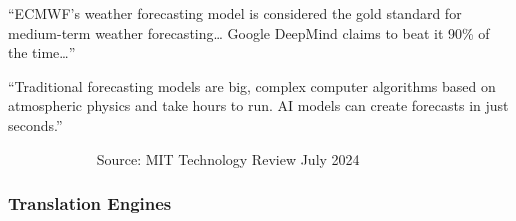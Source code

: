 \begin{frame}

    
    ``ECMWF's weather forecasting model is considered the gold standard for
        medium-term weather forecasting\ldots 
        Google DeepMind claims to beat it 90\% of the time\ldots''

    \vspace{0.5em}
    \vspace{0.5em}

    ``Traditional forecasting models are big, complex computer algorithms based
    on atmospheric physics and take hours to run. AI models can create forecasts
    in just seconds.'' 
    \vspace{0.5em}
    \vspace{0.5em}

    $\quad \qquad$$\quad \qquad$ Source: MIT Technology Review  July 2024



\end{frame}



\begin{frame}
    \frametitle{Translation Engines}
    
    \begin{figure}
       \centering
    \end{figure}

\end{frame}


